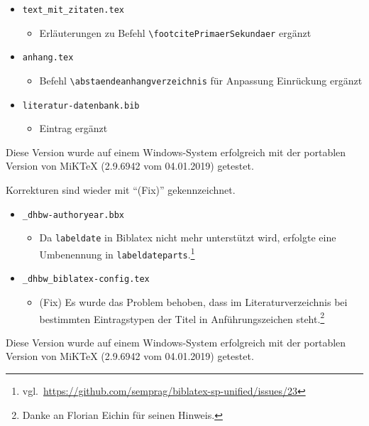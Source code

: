 \begin{itemize}
\item \verb|text_mit_zitaten.tex|
\begin{itemize}
\item Erläuterungen zu Befehl \verb|\footcitePrimaerSekundaer| ergänzt
\end{itemize}

\item \verb|anhang.tex|
\begin{itemize}
\item Befehl \verb|\abstaendeanhangverzeichnis| für Anpassung Einrückung ergänzt
\end{itemize}

\item \verb|literatur-datenbank.bib|
\begin{itemize}
\item Eintrag ergänzt
\end{itemize}

\end{itemize}

\label{anhang:ReleaseNotes17}
Diese Version wurde auf einem Windows-System erfolgreich mit der portablen Version von MiKTeX (2.9.6942 vom 04.01.2019) getestet.

Korrekturen sind wieder mit \enquote{(Fix)} gekennzeichnet.

\begin{itemize}
\item \verb|_dhbw-authoryear.bbx|
\begin{itemize}
\item Da \verb|labeldate| in Biblatex nicht mehr unterstützt wird, erfolgte eine Umbenennung in 
\verb|labeldateparts|.\footnote{vgl.\ \url{https://github.com/semprag/biblatex-sp-unified/issues/23}}
\end{itemize}

\item \verb|_dhbw_biblatex-config.tex|
\begin{itemize}
\item (Fix) Es wurde das Problem behoben, dass im Literaturverzeichnis bei bestimmten Eintragstypen der Titel in Anführungszeichen steht.\footnote{Danke an Florian Eichin für seinen Hinweis.}
\end{itemize}

\end{itemize}


\label{anhang:ReleaseNotes18}
Diese Version wurde auf einem Windows-System erfolgreich mit der portablen Version von MiKTeX (2.9.6942 vom 04.01.2019) getestet.

